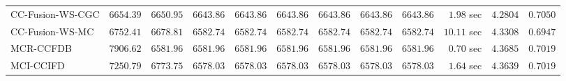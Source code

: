 \begin{table}[H]
\begin{tabular}{lrrrrrrrrrrr}
    CC-Fusion-WS-CGC & $      6654.39$ & $      6650.95$ & $      6643.86$ & $      6643.86$ & $      6643.86$ & $      6643.86$ & $      6643.86$ & $      6643.86$ & $         1.98$ sec    & $       4.2804$  & $       0.7050$ \\ 
     CC-Fusion-WS-MC & $      6752.41$ & $      6678.81$ & $      6582.74$ & $      6582.74$ & $      6582.74$ & $      6582.74$ & $      6582.74$ & $      6582.74$ & $        10.11$ sec    & $       4.3308$  & $       0.6947$ \\ 
\cmidrule{1-1} 
           MCR-CCFDB & $      7906.62$ & $      6581.96$ & $      6581.96$ & $      6581.96$ & $      6581.96$ & $      6581.96$ & $      6581.96$ & $      6581.96$ & $         0.70$ sec    & $       4.3685$  & $       0.7019$ \\ 
\cmidrule{1-1} 
           MCI-CCIFD & $      7250.79$ & $      6773.75$ & $      6578.03$ & $      6578.03$ & $      6578.03$ & $      6578.03$ & $      6578.03$ & $      6578.03$ & $         1.64$ sec    & $       4.3639$  & $       0.7019$ \\ 
\bottomrule
\end{tabular}
\end{table}

